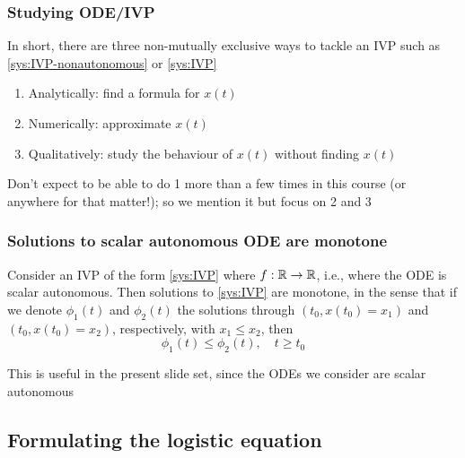 \documentclass[aspectratio=169]{beamer}
\begin{document}
\begin{frame}\frametitle{Studying ODE/IVP}
In short, there are three non-mutually exclusive ways to tackle an IVP such as \eqref{sys:IVP-nonautonomous} or \eqref{sys:IVP}
\vfill
\begin{enumerate}
\item Analytically: find a formula for $x(t)$
\vfill
\item Numerically: approximate $x(t)$
\vfill
\item Qualitatively: study the behaviour of $x(t)$ without finding $x(t)$
\end{enumerate}
\vfill
Don't expect to be able to do 1 more than a few times in this course (or anywhere for that matter!); so we mention it but focus on 2 and 3
\end{frame}

\begin{frame}\frametitle{Solutions to scalar autonomous ODE are monotone}
\begin{theorem}
\label{th:solutions-ODE-1storder-scalar-monotone}
Consider an IVP of the form \eqref{sys:IVP} where $f:\mathbb{R}\to\mathbb{R}$, i.e., where the ODE is scalar autonomous.
\vskip0.5cm
Then solutions to \eqref{sys:IVP} are monotone, in the sense that if we denote $\phi_1(t)$ and $\phi_2(t)$ the solutions through $(t_0,x(t_0)=x_1)$ and $(t_0,x(t_0)=x_2)$, respectively, with $x_1\leq x_2$, then
\[
\phi_1(t)\leq \phi_2(t),\quad t\geq t_0
\]
\end{theorem}
\vfill
This is useful in the present slide set, since the ODEs we consider are scalar autonomous
\end{frame}


\subsection{Formulating the logistic equation}

\end{document}
